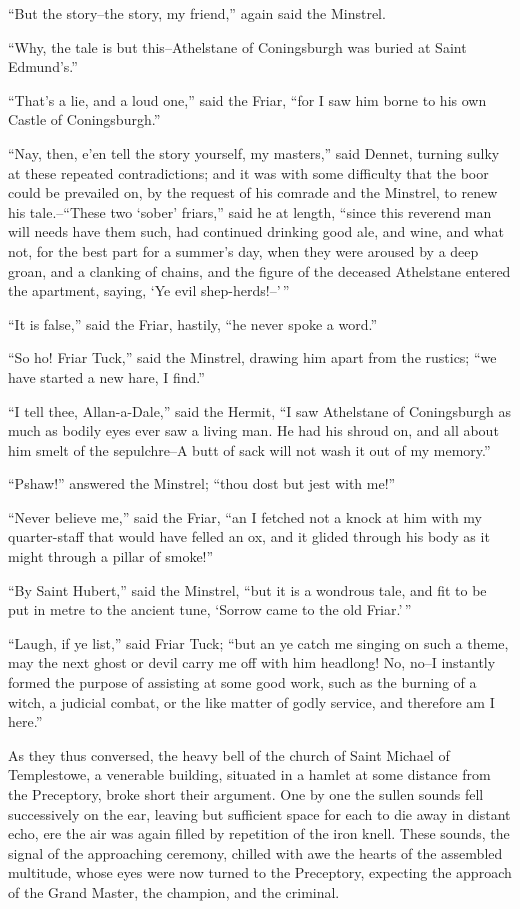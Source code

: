 ``But the story--the story, my friend,'' again said the Minstrel.

``Why, the tale is but this--Athelstane of Coningsburgh was buried at
Saint Edmund's.''

``That's a lie, and a loud one,'' said the Friar, ``for I saw him borne
to his own Castle of Coningsburgh.''

``Nay, then, e'en tell the story yourself, my masters,'' said Dennet,
turning sulky at these repeated contradictions; and it was with some
difficulty that the boor could be prevailed on, by the request of his
comrade and the Minstrel, to renew his tale.--``These two `sober'
friars,'' said he at length, ``since this reverend man will needs have
them such, had continued drinking good ale, and wine, and what not, for
the best part for a summer's day, when they were aroused by a deep
groan, and a clanking of chains, and the figure of the deceased
Athelstane entered the apartment, saying, `Ye evil shep-herds!--'\,''

``It is false,'' said the Friar, hastily, ``he never spoke a word.''

``So ho! Friar Tuck,'' said the Minstrel, drawing him apart from the
rustics; ``we have started a new hare, I find.''

``I tell thee, Allan-a-Dale,'' said the Hermit, ``I saw Athelstane of
Coningsburgh as much as bodily eyes ever saw a living man. He had his
shroud on, and all about him smelt of the sepulchre--A butt of sack will
not wash it out of my memory.''

``Pshaw!'' answered the Minstrel; ``thou dost but jest with me!''

``Never believe me,'' said the Friar, ``an I fetched not a knock at him
with my quarter-staff that would have felled an ox, and it glided
through his body as it might through a pillar of smoke!''

``By Saint Hubert,'' said the Minstrel, ``but it is a wondrous tale, and
fit to be put in metre to the ancient tune, `Sorrow came to the old
Friar.'\,''

``Laugh, if ye list,'' said Friar Tuck; ``but an ye catch me singing on
such a theme, may the next ghost or devil carry me off with him
headlong! No, no--I instantly formed the purpose of assisting at some
good work, such as the burning of a witch, a judicial combat, or the
like matter of godly service, and therefore am I here.''

As they thus conversed, the heavy bell of the church of Saint Michael of
Templestowe, a venerable building, situated in a hamlet at some distance
from the Preceptory, broke short their argument. One by one the sullen
sounds fell successively on the ear, leaving but sufficient space for
each to die away in distant echo, ere the air was again filled by
repetition of the iron knell. These sounds, the signal of the
approaching ceremony, chilled with awe the hearts of the assembled
multitude, whose eyes were now turned to the Preceptory, expecting the
approach of the Grand Master, the champion, and the criminal.

